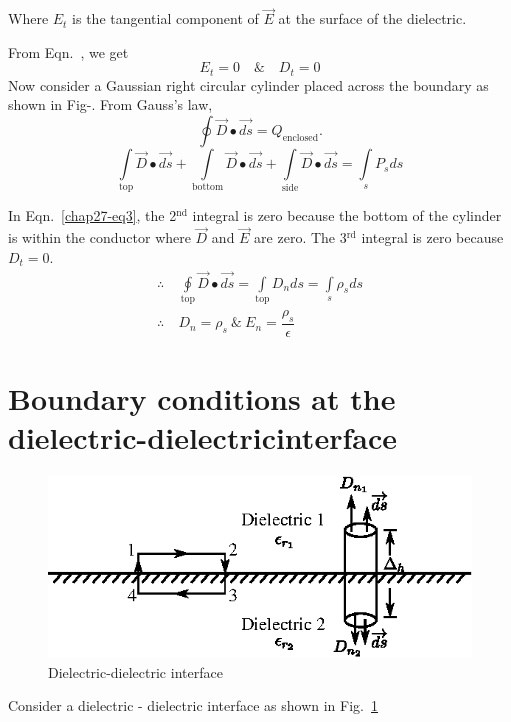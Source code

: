 Where $E_{t}$ is the tangential component of $\overrightarrow{E}$ at the surface of the dielectric. 

From Eqn.~\label{chap27-eq2}, we get 
$$
 E_{t} = 0\quad \text{\&}\quad D_{t} = 0
$$
Now consider a Gaussian right circular cylinder placed across the boundary as shown in Fig-. From Gauss's law, 
$$
\oint \overrightarrow{D} \bullet \overrightarrow{ds} = Q_{\text{enclosed}}.
$$
\begin{equation*}
\int\limits_{\text{top}} \overrightarrow{D} \bullet \overrightarrow{ds} + \int\limits_{\text{bottom}} \overrightarrow{D} \bullet \overrightarrow{ds} + \int\limits_{\text{side}} \overrightarrow{D} \bullet \overrightarrow{ds} = \int\limits_{s} P_{s}ds\label{chap27-eq3}
\end{equation*}

In Eqn.~\eqref{chap27-eq3}, the 2$^{\text{nd}}$ integral is zero because the bottom of the cylinder is within the conductor where $\overrightarrow{D}$ and $\overrightarrow{E}$ are zero. The 3$^{\text{rd}}$ integral is zero because $D_{t} = 0$. 
\begin{align*}
\therefore \ & \oint\limits_{\text{top}} \overrightarrow{D} \bullet \overrightarrow{ds} = \int\limits_{\text{top}} D_{n}ds = \int\limits_{s} \rho_{s}ds\\
\therefore \ & D_{n} = \rho_{s} ~\&~ E_{n} = \dfrac{\rho_{s}}{\epsilon}
\end{align*}

\section{Boundary conditions at the dielectric-dielectric\break interface}\label{chap27-sec2}
\begin{figure}[H]
\centering
\includegraphics[scale=1.1]{images/fig2.eps}
\caption{Dielectric-dielectric interface}\label{chap27-fig2}
\end{figure}


Consider a dielectric - dielectric interface as shown in Fig.~\ref{chap27-fig2}

